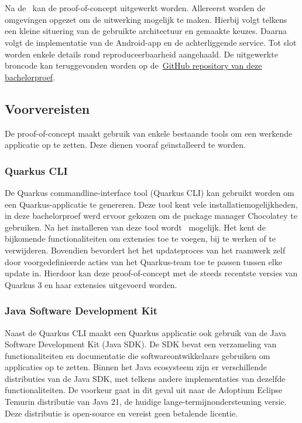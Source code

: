 
\chapter{}
\label{ch:proof-of-concept}
Na de~ kan de proof-of-concept uitgewerkt worden.
Allereerst worden de omgevingen opgezet om de uitwerking mogelijk te maken.
Hierbij volgt telkens een kleine situering van de gebruikte architectuur en gemaakte keuzes.
Daarna volgt de implementatie van de Android-app en de achterliggende service.
Tot slot worden enkele details rond reproduceerbaarheid aangehaald.
\hypertarget{github}{De uitgewerkte broncode kan teruggevonden worden op de~\hyperlink{https://github.com/+/2324-bachelorproef-cantaertmaurice/tree/master/proof-of-concept}{GitHub repository van deze bachelorproef}}.

\section{Voorvereisten}
\label{sec:voorvereisten}
De proof-of-concept maakt gebruik van enkele bestaande tools om een werkende applicatie op te zetten.
Deze dienen vooraf ge\"{\i}nstalleerd te worden.

\subsection{Quarkus CLI}
\label{subsec:de-quarkus-cli}
De Quarkus commandline-interface tool (Quarkus CLI) kan gebruikt worden om een Quarkus-applicatie te genereren.
Deze tool kent vele installatiemogelijkheden, in deze bachelorproef werd ervoor gekozen om de package manager Chocolatey te gebruiken.
Na het installeren van deze tool wordt~ mogelijk.
Het kent de bijkomende functionaliteiten om extensies toe te voegen, bij te werken of te verwijderen.
Bovendien bevordert het het updateproces van het raamwerk zelf door voorgedefinieerde acties van het Quarkus-team toe te passen tussen elke update in.
Hierdoor kan deze proof-of-concept met de steeds recentste versies van Quarkus 3 en haar extensies uitgevoerd worden.

\subsection{Java Software Development Kit}
\label{subsec:java-software-development-kit}
Naast de Quarkus CLI maakt een Quarkus applicatie ook gebruik van de Java Software Development Kit (Java SDK).
De SDK bevat een verzameling van functionaliteiten en documentatie die softwareontwikkelaars gebruiken om applicaties op te zetten.
Binnen het Java ecosysteem zijn er verschillende distributies van de Java SDK, met telkens andere implementaties van dezelfde functionaliteiten.
De voorkeur gaat in dit geval uit naar de Adoptium Eclipse Temurin distributie van Java 21, de huidige lange-termijnondersteuning versie.
Deze distributie is open-source en vereist geen betalende licentie.

